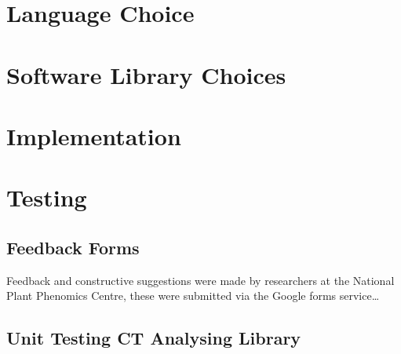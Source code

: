\documentclass[11pt]{report}
\begin{document}
\section{Language Choice}
\label{sec-2-6}
\section{Software Library Choices}
\label{sec-2-7}
\section{Implementation}
\label{sec-2-8}

\section{Testing}
\label{sec-2-9}
\subsection{Feedback Forms}
\label{sec-2-9-1}
Feedback and constructive suggestions were made by researchers at the National Plant Phenomics Centre, these were submitted via the Google forms service\ldots{}
\subsection{Unit Testing CT Analysing Library}
\label{sec-2-9-2}
\end{document}
